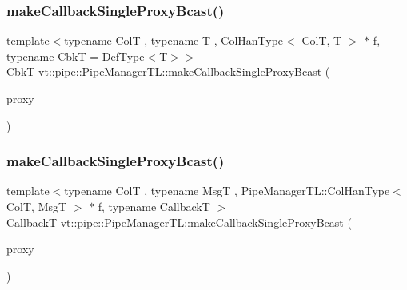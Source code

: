 \subsubsection{\texorpdfstring{make\+Callback\+Single\+Proxy\+Bcast()}{makeCallbackSingleProxyBcast()}\hspace{0.1cm}{\footnotesize\ttfamily [1/2]}}
{\footnotesize\ttfamily template$<$typename ColT , typename T , Col\+Han\+Type$<$ Col\+T, T $>$ $\ast$ f, typename CbkT  = Def\+Type$<$\+T$>$$>$ \\
CbkT vt\+::pipe\+::\+Pipe\+Manager\+T\+L\+::make\+Callback\+Single\+Proxy\+Bcast (\begin{DoxyParamCaption}\item[{\hyperlink{structvt_1_1pipe_1_1_pipe_manager_t_l_af56c58cad882496e35f01227d4da3898}{Col\+Proxy\+Type}$<$ ColT $>$}]{proxy }\end{DoxyParamCaption})}

\mbox{\label{structvt_1_1pipe_1_1_pipe_manager_t_l_aff5140772699150c68dc912017e3a670}} 
\subsubsection{\texorpdfstring{make\+Callback\+Single\+Proxy\+Bcast()}{makeCallbackSingleProxyBcast()}\hspace{0.1cm}{\footnotesize\ttfamily [2/2]}}
{\footnotesize\ttfamily template$<$typename ColT , typename MsgT , Pipe\+Manager\+T\+L\+::\+Col\+Han\+Type$<$ Col\+T, Msg\+T $>$ $\ast$ f, typename CallbackT $>$ \\
CallbackT vt\+::pipe\+::\+Pipe\+Manager\+T\+L\+::make\+Callback\+Single\+Proxy\+Bcast (\begin{DoxyParamCaption}\item[{\hyperlink{structvt_1_1pipe_1_1_pipe_manager_t_l_af56c58cad882496e35f01227d4da3898}{Col\+Proxy\+Type}$<$ ColT $>$}]{proxy }\end{DoxyParamCaption})}

\mbox{\label{structvt_1_1pipe_1_1_pipe_manager_t_l_aff70024da9ee15ef2c935ca21d18a80d}} 

